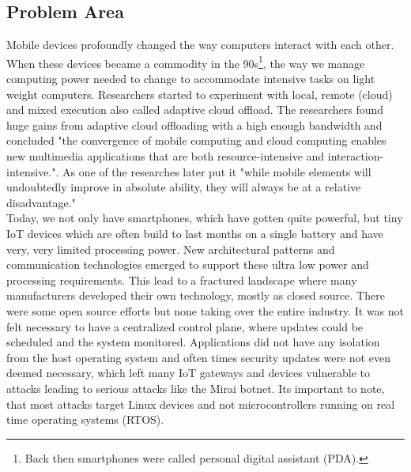 \subsection{Problem Area}\label{sec:problemArea}
{
Mobile devices profoundly changed the way computers interact with each other. When these devices became a commodity in the 90s\footnote{Back then smartphones were called personal digital assistant (PDA).}, the way we manage computing power needed to change to accommodate intensive tasks on light weight computers. Researchers started to experiment with local, remote (cloud) and mixed execution also called adaptive cloud offload. The researchers found huge gains from adaptive cloud offloading with a high enough bandwidth and concluded "the convergence of mobile computing and cloud computing enables new multimedia applications that are both resource-intensive and interaction-intensive."\cite{noble1997agileIoTGatewayOdyssey}. As one of the researches later put it "while mobile elements will undoubtedly improve in absolute ability, they will always be at a relative disadvantage."\cite{satyanarayanan2015briefHistoryIoTGateway}\\
Today, we not only have smartphones, which have gotten quite powerful, but tiny IoT devices which are often build to last months on a single battery and have very, very limited processing power. New architectural patterns and communication technologies emerged to support these ultra low power and processing requirements. This lead to a fractured landscape where many manufacturers developed their own technology, mostly as closed source. There were some open source efforts but none taking over the entire industry. It was not felt necessary to have a centralized control plane, where updates could be scheduled and the system monitored. Applications did not have any isolation from the host operating system and often times security updates were not even deemed necessary, which left many IoT gateways and devices vulnerable to attacks leading to serious attacks like the Mirai botnet\cite{7971869MiraiAndOtherBotnetLinux}. Its important to note, that most attacks target Linux devices and not microcontrollers running on real time operating systems (RTOS).\\
}
